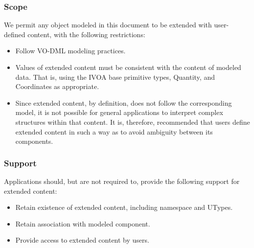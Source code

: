   \subsubsection{Scope}
  We permit any object modeled in this document to be extended with user-
  defined content, with the following restrictions:
  \begin{itemize}
  \item Follow VO-DML modeling practices.
  \item Values of extended content must be consistent with the content of
        modeled data. That is, using the IVOA base primitive types, Quantity,
        and Coordinates as appropriate.
  \item Since extended content, by definition, does not follow the
        corresponding model, it is not possible for general applications to
        interpret complex structures within that content. It is, therefore,
        recommended that users define extended content in such a way as to
        avoid ambiguity between its components.
  \end{itemize}

  \subsubsection{Support}
  Applications should, but are not required to, provide the following support for extended content:
  \begin{itemize}
  \item Retain existence of extended content, including namespace and UTypes.
  \item Retain association with modeled component.
  \item Provide access to extended content by users.
  \end{itemize}
  
